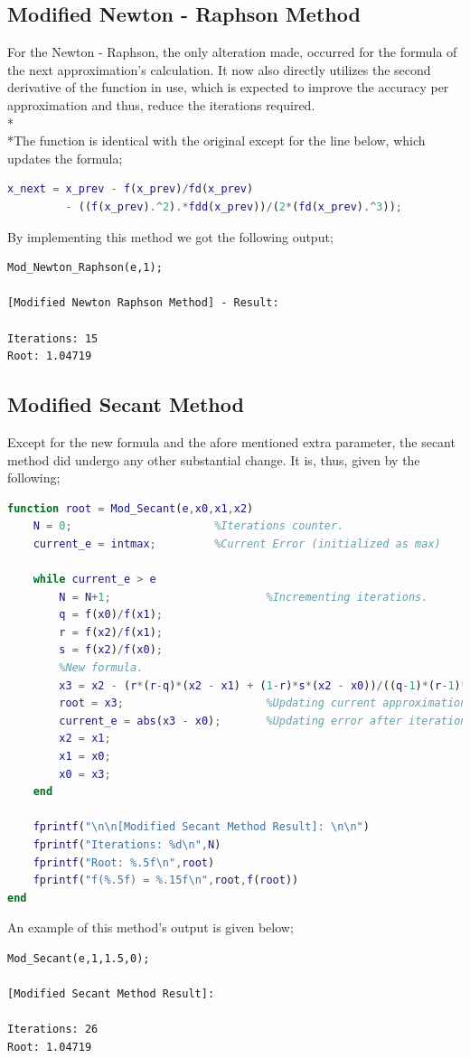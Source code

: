 \documentclass{article}
\begin{document}
\subsection{Modified Newton - Raphson Method}
For the Newton - Raphson, the only alteration made, occurred for the formula of the next approximation's calculation. It now also directly utilizes the second derivative of the function in use, which is expected to improve the accuracy per approximation and thus, reduce the iterations required.
\\*\\*The function is identical with the original except for the line below, which updates the formula;
\begin{lstlisting}[language=Matlab]
x_next = x_prev - f(x_prev)/fd(x_prev) 
         - ((f(x_prev).^2).*fdd(x_prev))/(2*(fd(x_prev).^3));
\end{lstlisting}
By implementing this method we got the following output;
\begin{lstlisting}
Mod_Newton_Raphson(e,1);

[Modified Newton Raphson Method] - Result: 

Iterations: 15
Root: 1.04719
\end{lstlisting}
\subsection{Modified Secant Method}
Except for the new formula and the afore mentioned extra parameter, the secant method did undergo any other substantial change. It is, thus, given by the following;
\begin{lstlisting}[language=Matlab]
function root = Mod_Secant(e,x0,x1,x2)
    N = 0;                      %Iterations counter.
    current_e = intmax;         %Current Error (initialized as max)

    while current_e > e
        N = N+1;                        %Incrementing iterations.
        q = f(x0)/f(x1);
        r = f(x2)/f(x1);
        s = f(x2)/f(x0);
        %New formula.
        x3 = x2 - (r*(r-q)*(x2 - x1) + (1-r)*s*(x2 - x0))/((q-1)*(r-1)*(s-1));  
        root = x3;                      %Updating current approximation.
        current_e = abs(x3 - x0);       %Updating error after iteration.                                                                                 
        x2 = x1;
        x1 = x0;
        x0 = x3;
    end    

    fprintf("\n\n[Modified Secant Method Result]: \n\n")   
    fprintf("Iterations: %d\n",N)                
    fprintf("Root: %.5f\n",root) 
    fprintf("f(%.5f) = %.15f\n",root,f(root)) 
end
\end{lstlisting}
An example of this method's output is given below;
\begin{lstlisting}
Mod_Secant(e,1,1.5,0);

[Modified Secant Method Result]: 

Iterations: 26
Root: 1.04719
\end{lstlisting}
\pagebreak
\end{document}
